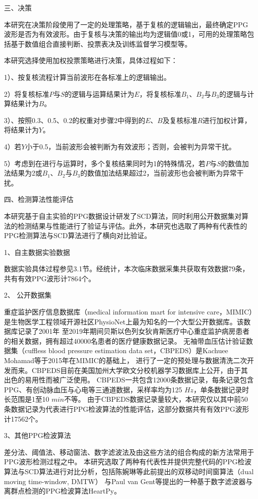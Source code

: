三、决策

本研究在决策阶段使用了一定的处理策略，基于复核的逻辑输出，最终确定PPG波形是否为有效波形。由于复核与决策的输出均为逻辑值0或1，可用的处理策略包括基于数值组合直接判断、投票表决及训练监督学习模型等\cite{Zhou2016}。

本研究选择使用加权投票策略进行决策，具体过程如下：

1）、按复核流程计算当前波形在各标准上的逻辑输出。

2）将复核标准$P$与$S$的逻辑与运算结果计为$E$，将复核标准$B_1$、$B_2$与$B_3$的逻辑与计算结果计为$B$。

3）、按照0.3、0.5、0.2的权重对步骤2中得到的$E$、$B$及复核标准$R$进行加权计算，将结果计为$Y$。

4）若$Y$小于0.5，当前波形会被判断为有效波形；否则，会被判为异常干扰。

5）考虑到在进行与运算时，多个复核结果同时为1的特殊情况，若$P$与$S$的数值加法结果为2或$B_1$、$B_2$与$B_3$的数值加法结果超过2，当前波形也会被判断为异常干扰。

四、检测算法性能评估

本研究基于自主实验的PPG数据设计研发了SCD算法，同时利用公开数据集对算法的检测结果与性能进行了验证与评估。此外，本研究也选取了两种有代表性的PPG检测算法与SCD算法进行了横向对比验证。

1、自主数据实验数据

数据实验具体过程参见3.1节。经统计，本次临床数据采集共获取有效数据79条，共有有效PPG波形计7864个。

2、 公开数据集

重症监护医疗信息数据库（medical information mart for intensive care，MIMIC）是生物医学工程领域开源社区PhysioNet上最为知名的一个大型公开数据库\cite{mit2022,Goldberger2000,johnson2018mimic,mimic4}。该数据库记录了2001年
至2019年期间贝斯以色列女狄肯斯医疗中心重症监护病房患者的相关数据，拥有超过40000名患者的医疗健康数据记录\cite{johnson2018mimic}。
无袖带血压估计验证数据集（cuffless blood pressure estimation data set，CBPEDS）是Kachuee Mohamad等\cite{Kachuee2015,ucibp2022}于2015年在MIMIC的基础上，
进行了一定的预处理与数据清洗二次开发而来。CBPEDS目前在美国加州大学欧文分校机器学习数据库上公开，由于其出色的易用性而被广泛使用。
CBPEDS一共包含12000条数据记录，每条记录包含PPG、有创动脉血压与心电等三通道数据，采样率均为125 $Hz$，单条数据记录时长范围是1至10 $min$不等。
由于CBPEDS数据记录量较大，本研究仅以其中前50条数据记录为代表进行PPG检波算法的性能评估，这部分数据共有有效PPG波形计17562个。

3、其他PPG检波算法

差分法、阈值法、移动窗法、数字滤波法及由这些方法的组合构成的新方法常用于PPG波形检测过程之中\cite{Chen2019,cwl,Chen2021,ChenH2019,QYY2008,SJ2007,van2019,van20192}。
本研究选取了两种有代表性并提供完整代码的PPG检波算法与SCD算法进行对比分析，包括陈婉琳等\cite{Chen2019,cwl}此前提出的双移动时间窗算法（dual moving time-window, DMTW）
与Paul van Gent等\cite{van2019,van20192}提出的一种基于数字滤波器与离群点检测的PPG检波算法HeartPy。

